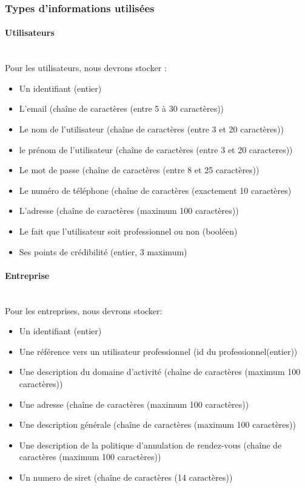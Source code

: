 \documentclass{article}
\begin{document}
\subsubsection{Types d'informations utilisées}
\paragraph{Utilisateurs}
~~\\
Pour les utilisateurs, nous devrons stocker :
\begin{itemize}
\item Un identifiant (entier)
\item L'email (chaîne de caractères (entre 5 à 30 caractères))
\item Le nom de l'utilisateur (chaîne de caractères (entre 3 et 20 caractères))
\item le prénom de l'utilisateur (chaîne de caractères (entre 3 et 20 caracteres))
\item Le mot de passe (chaîne de caractères (entre 8 et 25 caractères))
\item Le numéro de téléphone (chaîne de caractères (exactement 10 caractères)
\item L'adresse (chaîne de caractères (maximum 100 caractères))
\item Le fait que l'utilisateur soit professionnel ou non (booléen)
\item Ses points de crédibilité (entier, 3 maximum)
\end{itemize}

\paragraph{Entreprise}
~~\\
Pour les entreprises, nous devrons stocker:
\begin{itemize}
\item Un identifiant (entier)
\item Une référence vers un utilisateur professionnel (id du professionnel(entier))
\item Une description du domaine d'activité (chaîne de caractères (maximum 100 caractères))
\item Une adresse (chaîne de caractères (maximum 100 caractères))
\item Une description générale (chaîne de caractères (maximum 100 caractères))
\item Une description de la politique d'annulation de rendez-vous (chaîne de caractères (maximum 100 caractères))
\item Un numero de siret (chaîne de caractères (14 caractères))
\end{itemize}
\end{document}
